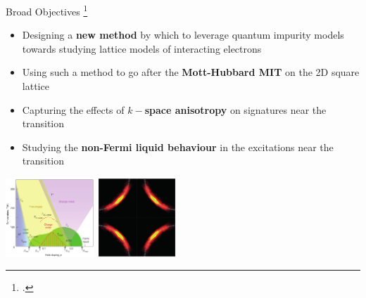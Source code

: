 \documentclass[11pt,aspectratio=169]{beamer}
\newcommand\focus[1]{%
	{\alert{\textbf{#1}}}
}
\begin{document}
\begin{frame}{Broad Objectives}
	\footcite{keimer2015quantum,Sebastian2014,Norman1998}

	\vspace*{-20pt}
\begin{itemize}
	\item Designing a \focus{new method} by which to leverage quantum impurity models towards studying lattice models of interacting electrons\\[10pt]
	\item Using such a method to go after the \focus{Mott-Hubbard MIT} on the 2D square lattice\\[10pt]
	\item Capturing the effects of \focus{\(k-\)space anisotropy} on signatures near the transition\\[10pt]
	\item Studying the \focus{non-Fermi liquid behaviour} in the excitations near the transition
\end{itemize}

\hspace*{\fill}
\includegraphics[width=0.25\textwidth]{cupratesDiagram.png}
\hspace*{\fill}
\includegraphics[width=0.22\textwidth]{fermiArc.png}
\hspace*{\fill}
\end{frame}
\end{document}
